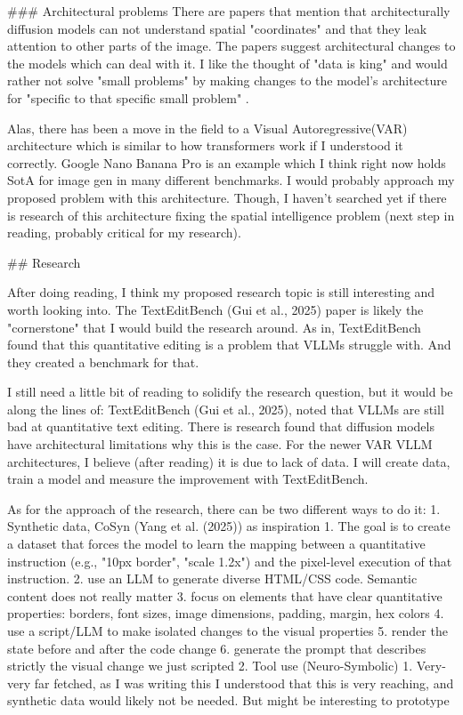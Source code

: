 ### Architectural problems
There are papers that mention that architecturally diffusion models can not understand spatial "coordinates" and that they leak attention to other parts of the image. The papers suggest architectural changes to the models which can deal with it. I like the thought of "data is king" and would rather not solve "small problems" by making changes to the model's architecture for "specific to that specific small problem" . 

Alas, there has been a move in the field to a Visual Autoregressive(VAR) architecture which is similar to how transformers work if I understood it correctly. Google Nano Banana Pro is an example which I think right now holds SotA for image gen in many different benchmarks. I would probably approach my proposed problem with this architecture. Though, I haven't searched yet if there is research of this architecture fixing the spatial intelligence problem (next step in reading, probably critical for my research).

## Research

After doing reading, I think my proposed research topic is still interesting and worth looking into. The TextEditBench (Gui et al., 2025) paper is likely the "cornerstone" that I would build the research around. As in, TextEditBench found that this quantitative editing is a problem that VLLMs struggle with. And they created a benchmark for that.

I still need a little bit of reading to solidify the research question, but it would be along the lines of:
TextEditBench (Gui et al., 2025), noted that VLLMs are still bad at quantitative text editing. There is research found that diffusion models have architectural limitations why this is the case. For the newer VAR VLLM architectures, I believe (after reading) it is due to lack of data. I will create data, train a model and measure the improvement with TextEditBench.

As for the approach of the research, there can be two different ways to do it:
1. Synthetic data, CoSyn (Yang et al. (2025)) as inspiration
	1. The goal is to create a dataset that forces the model to learn the mapping between a quantitative instruction (e.g., "10px border", "scale 1.2x") and the pixel-level execution of that instruction.
	2. use an LLM to generate diverse HTML/CSS code. Semantic content does not really matter
	3. focus on elements that have clear quantitative properties: borders, font sizes, image dimensions, padding, margin, hex colors
	4. use a script/LLM to make isolated changes to the visual properties
	5. render the state before and after the code change
	6. generate the prompt that describes strictly the visual change we just scripted
2. Tool use (Neuro-Symbolic)
	1. Very-very far fetched, as I was writing this I understood that this is very reaching, and synthetic data would likely not be needed. But might be interesting to prototype





